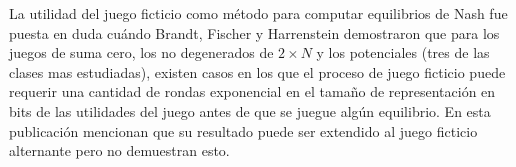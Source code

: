 La utilidad del juego ficticio como método para computar equilibrios de Nash fue puesta en duda cuándo Brandt, Fischer y Harrenstein \cite{brandt:rate:convergence} demostraron que para los juegos de suma cero, los no degenerados de $2 \times N$ y los potenciales (tres de las clases mas estudiadas), existen casos en los que el proceso de juego ficticio puede requerir una cantidad de rondas exponencial en el tamaño de representación en bits de las utilidades del juego antes de que se juegue algún equilibrio. En esta publicación mencionan que su resultado puede ser extendido al juego ficticio alternante pero no demuestran esto.

